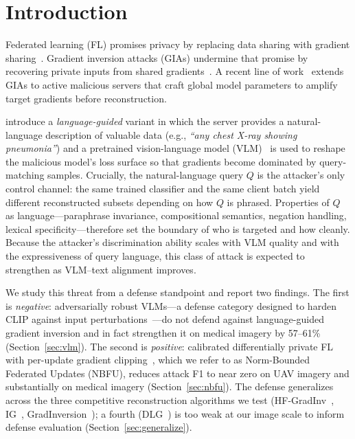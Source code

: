 \documentclass[11pt]{article}
\begin{document}
\section{Introduction}

Federated learning (FL) promises privacy by replacing data sharing with gradient sharing~\citep{fedavg2017}. Gradient inversion attacks (GIAs) undermine that promise by recovering private inputs from shared gradients~\citep{dlg2019,ig2020,gradinversion2021}. A recent line of work~\citep{robbing2022,fishing2023,geminio2024} extends GIAs to active malicious servers that craft global model parameters to amplify target gradients before reconstruction.

\citet{geminio2024} introduce a \emph{language-guided} variant in which the server provides a natural-language description of valuable data (e.g., \textit{``any chest X-ray showing pneumonia''}) and a pretrained vision-language model (VLM)~\citep{clip2021} is used to reshape the malicious model's loss surface so that gradients become dominated by query-matching samples. Crucially, the natural-language query $Q$ is the attacker's only control channel: the same trained classifier and the same client batch yield different reconstructed subsets depending on how $Q$ is phrased. Properties of $Q$ as language---paraphrase invariance, compositional semantics, negation handling, lexical specificity---therefore set the boundary of who is targeted and how cleanly. Because the attacker's discrimination ability scales with VLM quality and with the expressiveness of query language, this class of attack is expected to strengthen as VLM--text alignment improves.

We study this threat from a defense standpoint and report two findings. The first is \emph{negative}: adversarially robust VLMs---a defense category designed to harden CLIP against input perturbations~\citep{tecoa2023,fare2024,simclip2024}---do not defend against language-guided gradient inversion and in fact strengthen it on medical imagery by 57--61\% (Section~\ref{sec:vlm}). The second is \emph{positive}: calibrated differentially private FL with per-update gradient clipping~\citep{dpsgd2016}, which we refer to as Norm-Bounded Federated Updates (NBFU), reduces attack F1 to near zero on UAV imagery and substantially on medical imagery (Section~\ref{sec:nbfu}). The defense generalizes across the three competitive reconstruction algorithms we test (HF-GradInv~\citep{hfgradinv2024}, IG~\citep{ig2020}, GradInversion~\citep{gradinversion2021}); a fourth (DLG~\citep{dlg2019}) is too weak at our image scale to inform defense evaluation (Section~\ref{sec:generalize}).
\end{document}

